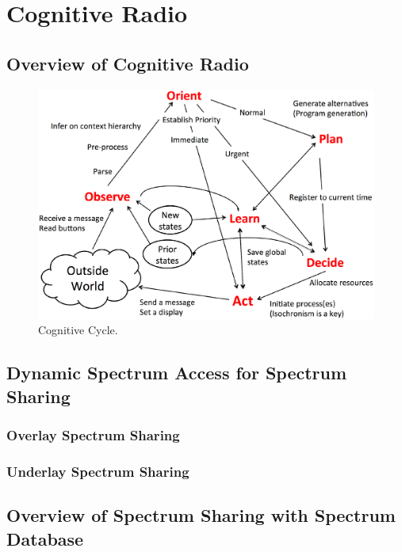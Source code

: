 \chapter[Cognitive Radio]{Cognitive Radio}
\label{chapter:CR}

\section{Overview of Cognitive Radio}

\begin{figure}[!htp]
\begin{center}
\includegraphics[width=150mm,clip]{cognitive_cycle.eps}
\caption{Cognitive Cycle.}
\label{fig:cognitive cycle}
\end{center}
\end{figure}

\section{Dynamic Spectrum Access for Spectrum Sharing}
    \subsection{Overlay Spectrum Sharing}
    \subsection{Underlay Spectrum Sharing}

\section{Overview of Spectrum Sharing with Spectrum Database}
